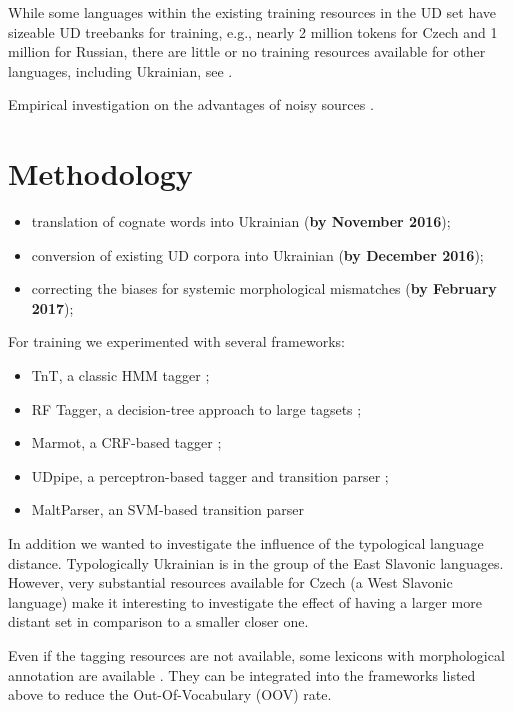 \documentclass[11pt]{article}
\begin{document}
While some languages within  the existing training resources in the UD set have sizeable UD treebanks for training, e.g., nearly 2 million tokens for Czech and 1 million for Russian, there are little or no training resources available for other languages, including Ukrainian, see .  

Empirical investigation on the advantages of noisy sources \cite{hovy14}.

\section{Methodology}

\begin{itemize}
\item translation of cognate words into Ukrainian \cite{babych16} (\textbf{by November 2016});
\item conversion of existing UD corpora into Ukrainian \cite{reddy11kannada} (\textbf{by December 2016});
\item correcting the biases for systemic morphological mismatches (\textbf{by February 2017});
\end{itemize}

For training we experimented with several frameworks:
\begin{itemize}
\item TnT, a classic HMM tagger \cite{brants00};
\item RF Tagger, a decision-tree approach to large tagsets \cite{schmid08};
\item Marmot, a CRF-based tagger \cite{muller13};
\item UDpipe, a perceptron-based tagger and transition parser \cite{straka16};
\item MaltParser, an SVM-based transition parser \cite{nivre06malt}
\end{itemize}

In addition we wanted to investigate the influence of the typological language distance.    Typologically Ukrainian is in the group of the East Slavonic languages.  However, very substantial resources available for Czech (a West Slavonic language) make it interesting to investigate the effect of having a larger more distant set in comparison to a smaller closer one.  

Even if the tagging resources are not available, some lexicons with morphological annotation are available \cite{derzhanski09}.  They can be integrated into the frameworks listed above to reduce the Out-Of-Vocabulary (OOV) rate.
\end{document}
